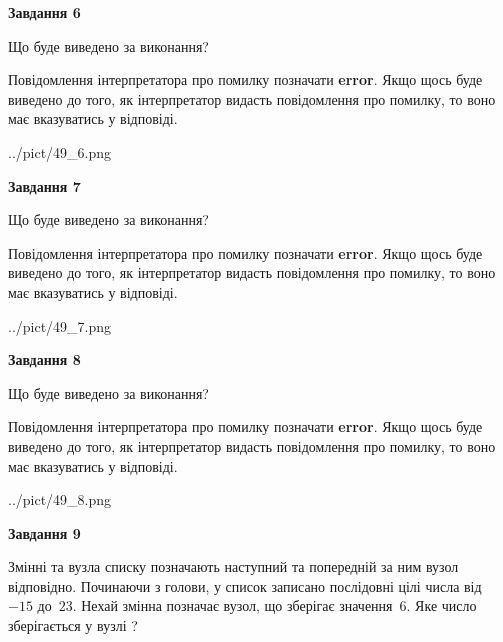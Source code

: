 \documentclass[12pt, ukrainian]{article}
\begin{document}
{\begin {large}
{\begin {center}\textbf{Завдання 6}\end {center}}\par
Що буде виведено за виконання?

Повідомлення інтерпретатора про помилку позначати \textbf{error}.
Якщо щось буде виведено до того, як інтерпретатор видасть повідомлення про помилку, 
то воно має вказуватись у відповіді. \par


\begin{center}
	{../pict/49_6.png}
\end{center}
\newpage

{\begin {center}\textbf{Завдання 7}\end {center}}\par
Що буде виведено за виконання?

Повідомлення інтерпретатора про помилку позначати \textbf{error}.
Якщо щось буде виведено до того, як інтерпретатор видасть повідомлення про помилку, 
то воно має вказуватись у відповіді. \par


\begin{center}
	{../pict/49_7.png}
\end{center}
\newpage

{\begin {center}\textbf{Завдання 8}\end {center}}\par
Що буде виведено за виконання?

Повідомлення інтерпретатора про помилку позначати \textbf{error}.
Якщо щось буде виведено до того, як інтерпретатор видасть повідомлення про помилку, 
то воно має вказуватись у відповіді. \par


\begin{center}
	{../pict/49_8.png}
\end{center}
\newpage

{\begin {center}\textbf{Завдання 9}\end {center}}\par
Змінні  та  вузла списку позначають наступний та попередній за ним вузол відповідно. Починаючи з голови, у список записано послідовні цілі числа від~$-15$ до~$23$. Нехай змінна  позначає вузол, що зберігає значення~$6$.
Яке число зберігається у вузлі  ?\par
\newpage


\end{large}}
\end{document}
